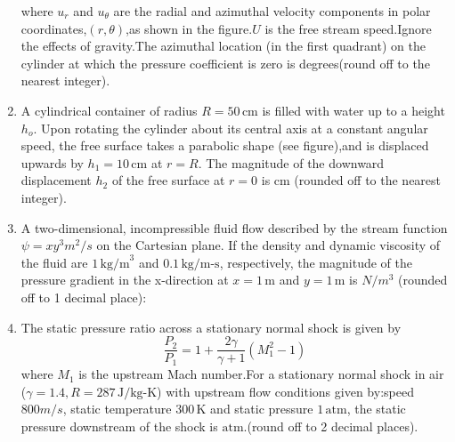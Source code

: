 \documentclass[journal,12pt,onecolumn]{IEEEtran}
\theoremstyle{remark}
\begin{document}
\begin{enumerate}
    
  \begin{figure}[H]
        \centering
    \end{figure}


    where $u_r$ and $u_\theta$ are the radial and azimuthal velocity components in polar coordinates,$(r,\theta)$,as shown in the figure.$U$ is the free stream speed.Ignore the effects of gravity.The azimuthal location (in the first quadrant) on the cylinder at which the pressure coefficient is zero is {\underline{\hspace{1cm}}} degrees(round off to the nearest integer).

    \item A cylindrical container of radius $R = 50 \, \text{cm}$ is filled with water up to a height $h_o$. Upon rotating the cylinder about its central axis at a constant angular speed, the free surface takes a parabolic shape (see figure),and is displaced upwards by $h_1 = 10 \, \text{cm}$ at $r = R$. The magnitude of the downward displacement $h_2$ of the free surface at $r = 0$ is {\underline{\hspace{1cm}}} cm (rounded off to the nearest integer).

        
  \begin{figure}[H]
        \centering
    \end{figure}

    \item A two-dimensional, incompressible fluid flow described by the stream function $\psi = xy^3 m^2/s $ on the Cartesian plane. If the density and dynamic viscosity of the fluid are $1 \, \text{kg/m}^3$ and $0.1 \, \text{kg/m-s}$, respectively, the magnitude of the pressure gradient in the x-direction at $x = 1 \, \text{m}$ and $y = 1 \, \text{m}$ is {\underline{\hspace{1cm}}} $N/m^3$ (rounded off to 1 decimal place):
    

    \item The static pressure ratio across a stationary normal shock is given by 
    \[
\frac{P_2}{P_1} = 1+\frac {2\gamma}{\gamma+1}(M_1^2-1)
\]
    where $M_1$ is the upstream Mach number.For a stationary normal shock in air ($\gamma = 1.4, R = 287 \, \text{J/kg-K}$) with upstream flow conditions given by:speed $800m/s$, static  temperature $ 300 \, \text{K}$ and static pressure $1 \, \text{atm}$, the static pressure downstream of the shock is {\underline{\hspace{1cm}}} $\text{atm}$.(round off to 2 decimal places).



\end{enumerate}
\end{document}
